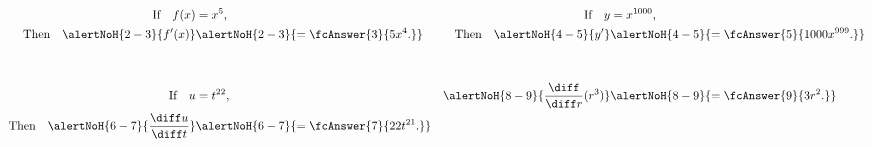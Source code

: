 \begin{frame}
\begin{example}
\abovedisplayskip=0pt
\belowdisplayskip=-15pt
\abovedisplayshortskip=0pt
\belowdisplayshortskip=0pt
\begin{align*}
\text{If}\quad f(x) & = x^5, %
 & \text{If}\quad y & = x^{1000},\\
\text{Then}\quad \alertNoH{ 2-3}{f'(x)}%
 & \alertNoH{ 2-3}{ = \fcAnswer{3}{5x^4.}} %
 & \text{Then}\quad \alertNoH{ 4-5}{y'}%
 & \alertNoH{ 4-5}{ = \fcAnswer{5}{1000x^{999}.}}\\
 & & & \\
 & & & \\
\text{If}\quad u & = t^{22}, %
 & \alertNoH{ 8-9}{\frac{\diff}{\diff r}(r^3)}%
 & \alertNoH{ 8-9}{ = \fcAnswer{9}{3r^2.}}\\
\text{Then}\quad \alertNoH{ 6-7}{\frac{\diff u}{\diff t}}%
 & \alertNoH{ 6-7}{ = \fcAnswer{7}{22t^{21}.}} & &
\end{align*}
\end{example}
\end{frame}
